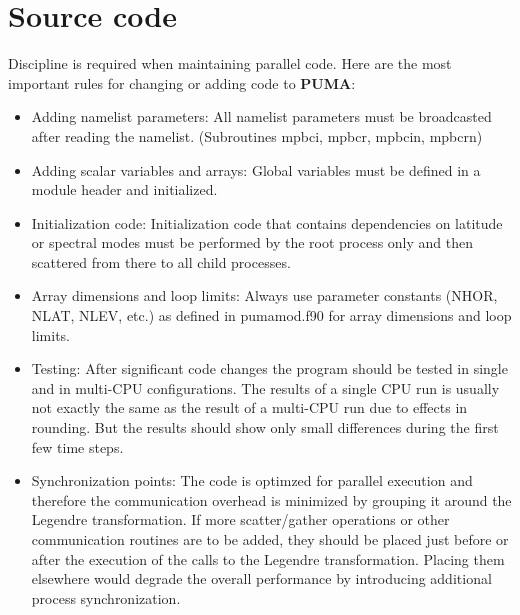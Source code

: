\section{Source code}

Discipline is required when maintaining parallel code.
Here are the most important rules for changing or adding code
to {\bf PUMA}:

\begin{itemize}

\item Adding namelist parameters:
   All namelist parameters must be broadcasted after reading
   the namelist. (Subroutines {\sub mpbci}, {\sub mpbcr}, 
   {\sub mpbcin}, {\sub mpbcrn})

\item Adding scalar variables and arrays:
   Global variables must be defined in a module header
   and initialized. 

\item Initialization code:
   Initialization code that contains dependencies on
   latitude or spectral modes must be performed by the
   root process only and then scattered from there
   to all child processes.

\item Array dimensions and loop limits:
   Always use parameter constants (NHOR, NLAT, NLEV, etc.)
   as defined in
   pumamod.f90 for array dimensions
   and loop limits. 

\item Testing:
   After significant code changes the program should be tested 
   in single and in multi-CPU configurations. The results
   of a single CPU run is usually not exactly the same as the
   result of a multi-CPU run due to effects in
   rounding. But the results should show only small
   differences during the first few time steps.

\item Synchronization points:
   The code is optimzed for parallel execution and therefore the 
   communication overhead is minimized by grouping it around the 
   Legendre transformation.
   If more scatter/gather operations or other communication
   routines are to be added, they should be placed
   just before or after the execution of the calls to the
   Legendre transformation. Placing them elsewhere would degrade
   the overall performance by introducing additional
   process synchronization.

\end{itemize}


